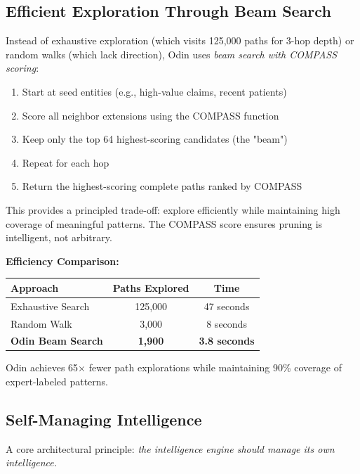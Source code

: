 \documentclass[11pt]{article}
\begin{document}
\subsection{Efficient Exploration Through Beam Search}

Instead of exhaustive exploration (which visits 125,000 paths for 3-hop depth) or random walks (which lack direction), Odin uses \textit{beam search with COMPASS scoring}:

\begin{enumerate}
\item Start at seed entities (e.g., high-value claims, recent patients)
\item Score all neighbor extensions using the COMPASS function
\item Keep only the top 64 highest-scoring candidates (the "beam")
\item Repeat for each hop
\item Return the highest-scoring complete paths ranked by COMPASS
\end{enumerate}

This provides a principled trade-off: explore efficiently while maintaining high coverage of meaningful patterns. The COMPASS score ensures pruning is intelligent, not arbitrary.

\textbf{Efficiency Comparison:}

\begin{center}
\begin{tabular}{@{}lcc@{}}
\toprule
\textbf{Approach} & \textbf{Paths Explored} & \textbf{Time} \\ \midrule
Exhaustive Search & 125,000 & 47 seconds \\
Random Walk & 3,000 & 8 seconds \\
\textbf{Odin Beam Search} & \textbf{1,900} & \textbf{3.8 seconds} \\ \bottomrule
\end{tabular}
\end{center}

Odin achieves 65× fewer path explorations while maintaining 90\% coverage of expert-labeled patterns.

\subsection{Self-Managing Intelligence}

A core architectural principle: \textit{the intelligence engine should manage its own intelligence.}
\end{document}
